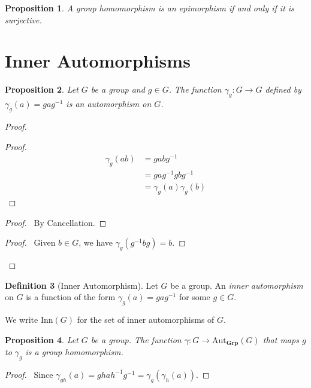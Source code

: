 \documentclass{book}
\let\qed\relax
\newtheorem{prop}{Proposition}[chapter]
\theoremstyle{definition}
\newtheorem{df}[prop]{Definition}
\newcommand{\Aut}[2]{\ensuremath{\mathrm{Aut}_{#1} \left( {#2} \right)}}
\newcommand{\Grp}{\ensuremath{\mathbf{Grp}}}
\newcommand{\inv}[1]{\ensuremath{{#1}^{-1}}}
\begin{document}
\begin{prop}
A group homomorphism is an epimorphism if and only if it is surjective.
\end{prop}


\section{Inner Automorphisms}

\begin{prop}
    Let $G$ be a group and $g \in G$. The function $\gamma_g : G \rightarrow G$ defined by $\gamma_g(a) = ga\inv{g}$ is an automorphism on $G$.
\end{prop}

\begin{proof}
    \pf
    \begin{proof}
        \pf
        \begin{align*}
            \gamma_g(ab) & = gab\inv{g}              \\
                         & = ga\inv{g} gb\inv{g}     \\
                         & = \gamma_g(a) \gamma_g(b)
        \end{align*}
    \end{proof}
    \begin{proof}
        \pf\ By Cancellation.
    \end{proof}
    \begin{proof}
        \pf\ Given $b \in G$, we have $\gamma_g(\inv{g}bg) = b$.
    \end{proof}
    \qed
\end{proof}

\begin{df}[Inner Automorphism]
    Let $G$ be a group. An \emph{inner automorphism} on $G$ is a function of the form $\gamma_g(a) = ga\inv{g}$ for some $g \in G$.
    
    We write $\mathrm{Inn}(G)$ for the set of inner automorphisms of $G$.
\end{df}

\begin{prop}
    Let $G$ be a group.
    The function $\gamma : G \rightarrow \Aut{\Grp}{G}$ that maps $g$ to $\gamma_g$ is a group homomorphism.
\end{prop}

\begin{proof}
    \pf\ Since $\gamma_{gh}(a) = gha\inv{h}\inv{g} = \gamma_g(\gamma_h(a))$. \qed
\end{proof}
\end{document}
